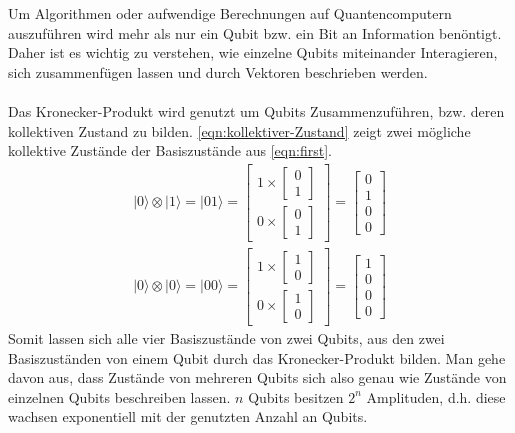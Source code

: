 Um Algorithmen oder aufwendige Berechnungen auf Quantencomputern auszuf\"uhren wird mehr als nur ein Qubit bzw. ein Bit an Information ben\"ontigt. Daher ist es wichtig zu verstehen, wie einzelne Qubits miteinander Interagieren, sich zusammenf\"ugen lassen und durch Vektoren beschrieben werden. \\\\
Das Kronecker-Produkt wird genutzt um Qubits Zusammenzuf\"uhren, bzw. deren kollektiven Zustand zu bilden. \ref{eqn:kollektiver-Zustand} zeigt zwei m\"ogliche kollektive Zust\"ande der Basiszust\"ande aus \ref{eqn:first}.
\begin{equation}\label{eqn:kollektiver-Zustand}
\begin{aligned}
  |0\rangle\otimes |1\rangle = |01\rangle = \begin{bmatrix}1 \times \begin{bmatrix} 0\\1\end{bmatrix}\\[1em] 0 \times \begin{bmatrix} 0\\1\end{bmatrix}\end{bmatrix} = \begin{bmatrix} 0 \\ 1 \\ 0 \\ 0\end{bmatrix} \\[1em]
  |0\rangle\otimes |0\rangle = |00\rangle = \begin{bmatrix}1 \times \begin{bmatrix} 1\\0\end{bmatrix}\\[1em] 0 \times \begin{bmatrix} 1\\0\end{bmatrix}\end{bmatrix} = \begin{bmatrix} 1 \\ 0 \\ 0 \\ 0\end{bmatrix}
\end{aligned}
\end{equation}
Somit lassen sich alle vier Basiszust\"ande von zwei Qubits, aus den zwei Basiszust\"anden von einem Qubit durch das Kronecker-Produkt bilden.
Man gehe davon aus, dass Zust\"ande von mehreren Qubits sich also genau wie Zust\"ande von einzelnen Qubits beschreiben lassen. $n$ Qubits besitzen $2^n$ Amplituden, d.h. diese wachsen exponentiell mit der genutzten Anzahl an Qubits.
